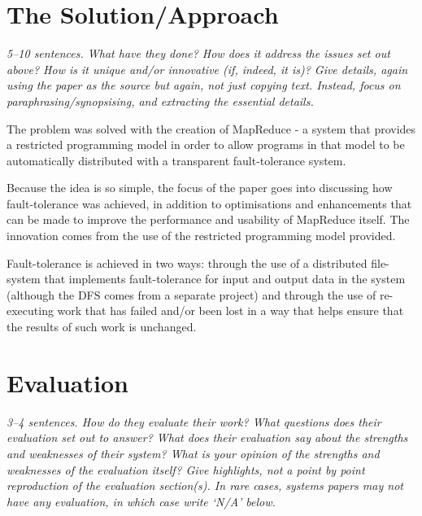 \documentclass[11pt]{article}
\begin{document}
\section*{The Solution/Approach}

\textsl{5--10 sentences. What have they done? How does it address the issues
set out above? How is it unique and/or innovative (if, indeed, it is)? Give
details, again using the paper as the source but again, not just copying text.
Instead, focus on paraphrasing/synopsising, and extracting the essential
details.}

The problem was solved with the creation of MapReduce - a system that provides
a restricted programming model in order to allow programs in that model to be
automatically distributed with a transparent fault-tolerance system.

Because the idea is so simple, the focus of the paper goes into discussing how
fault-tolerance was achieved, in addition to optimisations and enhancements
that can be made to improve the performance and usability of MapReduce itself.
The innovation comes from the use of the restricted programming model provided.

Fault-tolerance is achieved in two ways: through the use of a distributed
file-system that implements fault-tolerance for input and output data in the
system (although the DFS comes from a separate project) and through the use of
re-executing work that has failed and/or been lost in a way that helps ensure
that the results of such work is unchanged.

\section*{Evaluation}

\textsl{3--4 sentences. How do they evaluate their work? What questions does
their evaluation set out to answer? What does their evaluation say about the
strengths and weaknesses of their system? What is your opinion of the strengths
and weaknesses of the evaluation itself? Give highlights, not a point by point
reproduction of the evaluation section(s). In rare cases, systems papers may
not have any evaluation, in which case write `N/A' below.}
\end{document}
